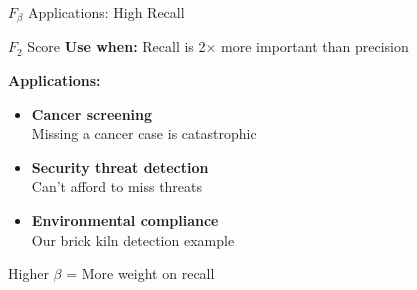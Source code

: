 \documentclass{beamer}
\begin{document}
\begin{frame}{$F_\beta$ Applications: High Recall}
\begin{examplebox}{$F_2$ Score}
\small
\textbf{Use when:} Recall is 2× more important than precision

\vspace{0.15cm}

\textbf{Applications:}
\begin{itemize}
    \item \textbf{Cancer screening} \\
          Missing a cancer case is catastrophic

    \vspace{0.2cm}

    \item \textbf{Security threat detection} \\
          Can't afford to miss threats

    \vspace{0.2cm}

    \item \textbf{Environmental compliance} \\
          Our brick kiln detection example
\end{itemize}
\end{examplebox}

\vspace{0.15cm}

\begin{center}
Higher $\beta$ = More weight on recall
\end{center}
\end{frame}
\end{document}
